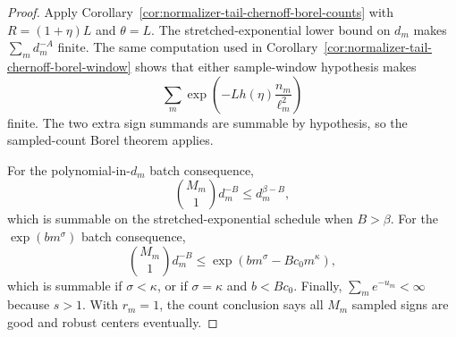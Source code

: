 \documentclass[11pt]{amsart}
\numberwithin{equation}{section}
\theoremstyle{definition}
\theoremstyle{remark}
\begin{document}
\begin{proof}
Apply Corollary~\ref{cor:normalizer-tail-chernoff-borel-counts} with
\(R=(1+\eta)L\) and \(\theta=L\).  The stretched-exponential lower bound on
\(d_m\) makes \(\sum_m d_m^{-A}\) finite.  The same computation used in
Corollary~\ref{cor:normalizer-tail-chernoff-borel-window} shows that either
sample-window hypothesis makes
\[
  \sum_m\exp\left(-Lh(\eta)\frac{n_m}{\ell_m^2}\right)
\]
finite.  The two extra sign summands are summable by hypothesis, so the
sampled-count Borel theorem applies.

For the polynomial-in-\(d_m\) batch consequence,
\[
  \binom{M_m}{1}d_m^{-B}\le d_m^{\beta-B},
\]
which is summable on the stretched-exponential schedule when \(B>\beta\).  For
the \(\exp(bm^\sigma)\) batch consequence,
\[
  \binom{M_m}{1}d_m^{-B}
  \le \exp\left(bm^\sigma-Bc_0m^\kappa\right),
\]
which is summable if \(\sigma<\kappa\), or if \(\sigma=\kappa\) and
\(b<Bc_0\).  Finally, \(\sum_m e^{-u_m}<\infty\) because \(s>1\).  With
\(r_m=1\), the count conclusion says all \(M_m\) sampled signs are good and
robust centers eventually.
\end{proof}
\end{document}
